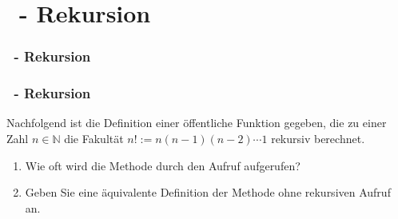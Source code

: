 \def\stitle{\theexercise\ - Rekursion}

\section{\stitle}
\begin{frame}
  \frametitle{\stitle}%
\tableofcontents[current]
\end{frame}

\begin{frame}%
  \frametitle{\stitle}%

Nachfolgend ist die Definition einer öffentliche Funktion gegeben, die zu einer Zahl $n \in \mathbb{N}$ die Fakultät $n! := n (n-1) (n-2)  \dotsm 1$ rekursiv berechnet.



\begin{enumerate}
\item Wie oft wird die Methode durch den Aufruf  aufgerufen?
\item Geben Sie eine äquivalente Definition der Methode ohne rekursiven Aufruf an.
\end{enumerate}
\end{frame}
